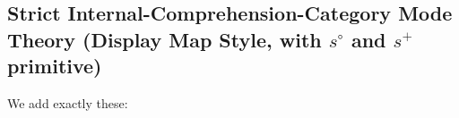 \documentclass[10pt]{article}
\newcommand\TermTwoT[5]{\ensuremath{#1 \mid #3 \vDash_{#5} #2 : #4}}
\newcommand\TrPlus[2]{\ensuremath{#1^+(#2)}}
\begin{document}



\subsection{Strict Internal-Comprehension-Category Mode Theory (Display Map Style, with $s^\circ$ and $s^+$ primitive)}

We add exactly these:
\end{document}
